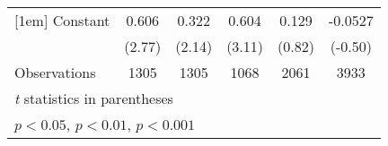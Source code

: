 {\begin{tabular*}{\linewidth}{@{\hskip\tabcolsep\extracolsep\fill}l*{5}{c}}
[1em]
Constant        &    0.606\sym{**} &    0.322\sym{*}  &    0.604\sym{**} &    0.129         &  -0.0527         \\
                &   (2.77)         &   (2.14)         &   (3.11)         &   (0.82)         &  (-0.50)         \\
\hline
Observations    &     1305         &     1305         &     1068         &     2061         &     3933         \\
\hline\hline
\multicolumn{6}{l}{\footnotesize \textit{t} statistics in parentheses}\\
\multicolumn{6}{l}{\footnotesize \sym{*} \(p<0.05\), \sym{**} \(p<0.01\), \sym{***} \(p<0.001\)}\\
\end{tabular*}
}
